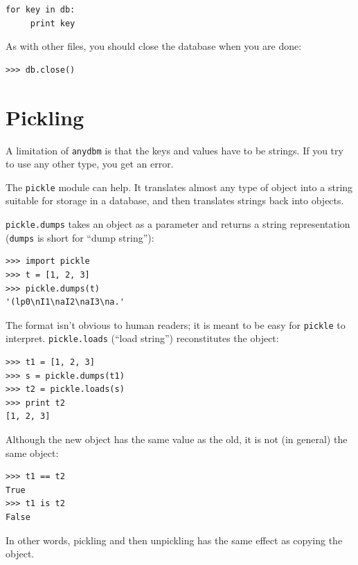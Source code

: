 \documentclass[10pt]{book}
\begin{document}

\beforeverb
\begin{verbatim}
for key in db:
     print key
\end{verbatim}
\afterverb
%
As with other files, you should close the database when you are
done:

\beforeverb
\begin{verbatim}
>>> db.close()
\end{verbatim}
\afterverb
%



\section{Pickling}


A limitation of {\tt anydbm} is that the keys and values have
to be strings.  If you try to use any other type, you get an
error.


The {\tt pickle} module can help.  It translates
almost any type of object into a string suitable for storage in a
database, and then translates strings back into objects.

{\tt pickle.dumps} takes an object as a parameter and returns
a string representation ({\tt dumps} is short for ``dump string''):

\beforeverb
\begin{verbatim}
>>> import pickle
>>> t = [1, 2, 3]
>>> pickle.dumps(t)
'(lp0\nI1\naI2\naI3\na.'
\end{verbatim}
\afterverb
%
The format isn't obvious to human readers; it is meant to be
easy for {\tt pickle} to interpret.  {\tt pickle.loads}
(``load string'') reconstitutes the object:

\beforeverb
\begin{verbatim}
>>> t1 = [1, 2, 3]
>>> s = pickle.dumps(t1)
>>> t2 = pickle.loads(s)
>>> print t2
[1, 2, 3]
\end{verbatim}
\afterverb
%
Although the new object has the same value as the old, it is
not (in general) the same object:

\beforeverb
\begin{verbatim}
>>> t1 == t2
True
>>> t1 is t2
False
\end{verbatim}
\afterverb
%
In other words, pickling and then unpickling has the same effect
as copying the object.
\end{document}

